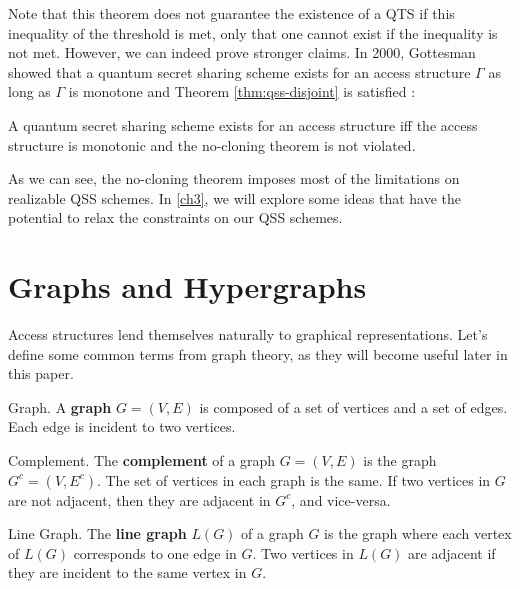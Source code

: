 Note that this theorem does not guarantee the existence of a QTS if this inequality of the threshold is met, only that one cannot exist if the inequality is not met. However, we can indeed prove stronger claims. In 2000, Gottesman showed that a quantum secret sharing scheme exists for an access structure $\Gamma$ as long as $\Gamma$ is monotone and Theorem \ref{thm:qss-disjoint} is satisfied \cite{Gottesman_2000}:

\begin{theorem}
    \label{monotone-gamma}
    A quantum secret sharing scheme exists for an access structure iff the access structure is monotonic and the no-cloning theorem is not violated.
\end{theorem}

As we can see, the no-cloning theorem imposes most of the limitations on realizable QSS schemes. In \cref{ch3}, we will explore some ideas that have the potential to relax the constraints on our QSS schemes. 

 
\section{Graphs and Hypergraphs}

Access structures lend themselves naturally to graphical representations. Let's define some common terms from graph theory, as they will become useful later in this paper. 

\begin{definition}{Graph.}
    \label{graph}
    A \textbf{graph} $G=(V,E)$ is composed of a set of vertices and a set of edges. Each edge is incident to two vertices.
\end{definition}

\begin{definition}{Complement.}
    \label{defn:complement}
    The \textbf{complement} of a graph $G = (V,E)$ is the graph $G^c = (V,E^c)$. The set of vertices in each graph is the same. If two vertices in $G$ are not adjacent, then they are adjacent in $G^c$, and vice-versa.
\end{definition}

\begin{definition}{Line Graph.}
    \label{defn:line-graph}
    The \textbf{line graph} $L(G)$ of a graph $G$ is the graph where each vertex of $L(G)$ corresponds to one edge in $G$. Two vertices in $L(G)$ are adjacent if they are incident to the same vertex in $G$. 
\end{definition}

